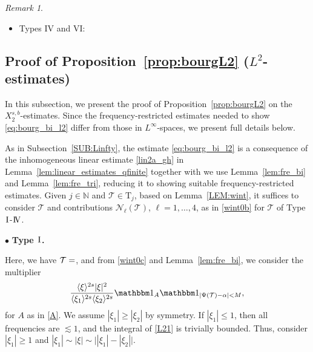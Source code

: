 \documentclass[%
11pt,  reqno]{amsart}
\makeatletter
\newcommand{\I}{\hspace{0.2mm}\textup{I}\hspace{0.2mm}}
\newcommand{\IV}{\textup{I \hspace{-2.9mm} V}}
\newcommand{\5}{\textup{V}}
\newcommand{\noi}{\noindent}
\newcommand{\ind}{\mathbbm 1}
\newcommand{\les}{\lesssim}
\theoremstyle{remark}
\newtheorem{remark}[theorem]{Remark}
\newcommand{\bul}{\bullet}
\newcommand{\TT}{\mathcal{T}}
\newcommand{\Tr}{\mathrm{T}}
\newcommand{\al}{\alpha}
\newcommand{\be}{\beta}
\renewcommand{\l}{\ell}
\newcommand{\jb}[1]
{\langle #1 \rangle}
\newcommand{\N}{\mathbb{N}}
\def\<#1>{\csname MH@symb@#1\endcsname}
\numberwithin{equation}{section}
\numberwithin{theorem}{section}
\newcommand{\Ncal}{\mathcal{N}}
\makeatother
\begin{document}
\begin{remark}
\begin{itemize}
In Case 3, we need to do the analogous change of variables based on Morse's Lemma (see \cite[pp.23-24]{CLS24}):
\begin{align}
\cdots &\les \jb{\xi}^{-3s-\al + (s\lor 0) +1} \int \ind_{| | \xi|\xi|^\al ( c + q_{11}^2 + q_2^2) - \be | \le M}  |\xi|^2  dq_{11} dq_2
\\
&
\les \jb{\xi}^{-3s - \al + 3 + (s\lor 0) - (1+\al)} M \les M , 
\end{align}
for $-3s -2\al + 2 < 0 \iff s > \frac23(1-\al) $. 

\item Types IV and VI:




\end{itemize}





\end{remark}



\subsection{Proof of Proposition~\ref{prop:bourgL2} ($L^2$-estimates)}
\label{SUB:L2}


In this subsection, we present the proof of Proposition~\ref{prop:bourgL2}
on the $X^{s, b}_{2}$-estimates. 
Since the frequency-restricted estimates needed to show \eqref{eq:bourg_bi_l2} differ from those in $L^\infty$-spaces, we present full details below. 




As in Subsection~\ref{SUB:Linfty}, 
the estimate \eqref{eq:bourg_bi_l2} is a consequence of the inhomogeneous linear estimate \eqref{lin2a_gh} in Lemma~\ref{lem:linear_estimates_qfinite} together with
we use Lemma~\ref{lem:fre_bi} and Lemma~\ref{lem:fre_tri}, reducing it to showing suitable frequency-restricted  estimates. 
Given $j\in \N$ and $\TT\in \Tr_j$,
based on Lemma~\ref{LEM:wint}, it suffices to consider $\TT$ and contributions $\Ncal_
\l(\TT)$, $\l=1, \ldots, 4$, as in \eqref{wint0b} for $\TT$ of Type $\I$-$\IV$. 


\smallskip

\noi
$\bul$ \textbf{Type $\I$.}

Here, we have $\TT = \<1>$, and
from \eqref{wint0c} and Lemma~\ref{lem:fre_bi}, we consider the multiplier
\begin{align}
\label{L21}
 \frac{\jb{\xi}^{2s} |\xi|^2 }{\jb{\xi_1}^{2s}\jb{\xi_2}^{2s}} 
    \ind_A \ind_{|\Psi(\TT) - \al| < M } , 
\end{align}
 for $A$ as in \eqref{A}. We assume $|\xi_1| \ge |\xi_2|$ by symmetry. 
If $|\xi_1| \le 1$, then all frequencies are $\les 1$, and the integral of \eqref{L21} is trivially bounded. Thus, consider $|\xi_1| \ge 1$ and $|\xi_1| \sim |\xi| \sim \big| |\xi_1| - |\xi_2| \big|$.
\end{document}
